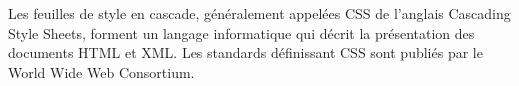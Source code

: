 \documentclass[a4paper]{report}
\begin{document}
\begin{spacing}{2}
\begin{minipage}{0.2\textwidth}
	\begin{minipage}{\linewidth}
	\end{minipage}
\end{minipage}
\hfill
\begin{minipage}{0.75\textwidth}
	Les feuilles de style en cascade, généralement appelées CSS de l'anglais Cascading Style Sheets, forment un langage informatique qui décrit la présentation des documents HTML et XML. Les standards définissant CSS sont publiés par le World Wide Web Consortium.\\
\end{minipage}\\
\begin{minipage}{0.28\textwidth}
	\begin{minipage}{\linewidth}

\end{minipage}
\end{minipage}
\end{spacing}
\end{document}
